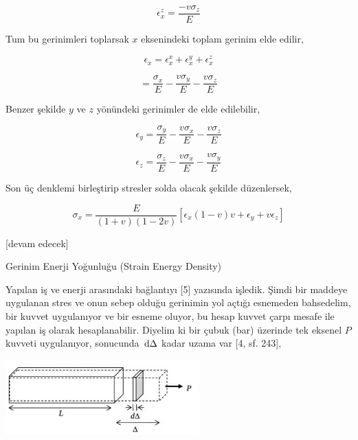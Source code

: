 \documentclass[12pt,fleqn]{article}\usepackage{../../common}
\begin{document}
$$
\epsilon_x^z =  \frac{- v \sigma_z}{E}
$$

Tum bu gerinimleri toplarsak $x$ eksenindeki toplam gerinim elde edilir,

$$
\epsilon_x = \epsilon_x^x + \epsilon_x^y + \epsilon_x^z
$$

$$
= \frac{\sigma_x}{E} - \frac{v \sigma_y}{E} - \frac{v \sigma_z}{E} 
$$

Benzer şekilde $y$ ve $z$ yönündeki gerinimler de elde edilebilir,

$$
\epsilon_y = \frac{\sigma_y}{E} - \frac{v \sigma_x}{E} - \frac{v \sigma_z}{E} 
$$

$$
\epsilon_z = \frac{\sigma_z}{E} - \frac{v \sigma_x}{E} - \frac{v \sigma_y}{E} 
$$

Son üç denklemi birleştirip stresler solda olacak şekilde düzenlersek,

$$
\sigma_x = \frac{E}{(1+v)(1-2v)} [\epsilon_x (1-v) v + \epsilon_y + v \epsilon_z ]
$$



[devam edecek]




























Gerinim Enerji Yoğunluğu (Strain Energy Density)

Yapılan iş ve enerji arasındaki bağlantıyı [5] yazısında işledik. Şimdi bir
maddeye uygulanan stres ve onun sebep olduğu gerinimin yol açtığı esnemeden
bahsedelim, bir kuvvet uygulanıyor ve bir esneme oluyor, bu hesap kuvvet çarpı
mesafe ile yapılan iş olarak hesaplanabilir. Diyelim ki bir çubuk (bar) üzerinde
tek eksenel $P$ kuvveti uygulanıyor, sonucunda $\,\mathrm{d} \Delta$ kadar uzama var
[4, sf. 243],

\includegraphics[width=20em]{phy_020_strs_00_07.jpg}
\end{document}
